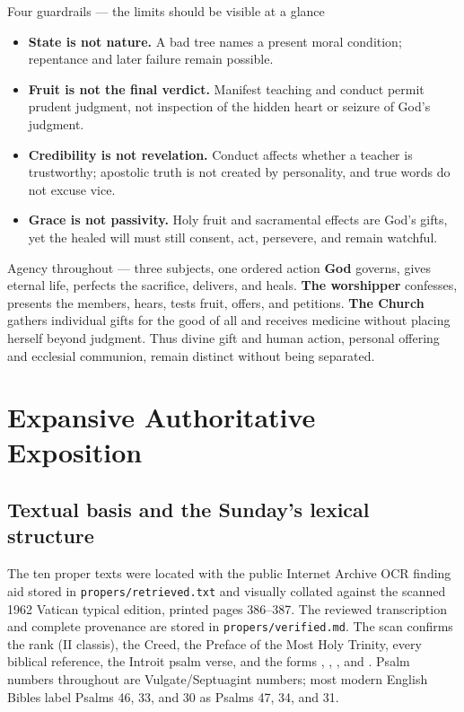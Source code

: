 \begin{deepstudy}
\begin{studybox}{Four guardrails --- the limits should be visible at a glance}
\begin{itemize}[topsep=0pt,itemsep=0.25em,parsep=0pt]
\item \textbf{State is not nature.} A bad tree names a present moral condition; repentance and later failure remain possible.
\item \textbf{Fruit is not the final verdict.} Manifest teaching and conduct permit prudent judgment, not inspection of the hidden heart or seizure of God's judgment.
\item \textbf{Credibility is not revelation.} Conduct affects whether a teacher is trustworthy; apostolic truth is not created by personality, and true words do not excuse vice.
\item \textbf{Grace is not passivity.} Holy fruit and sacramental effects are God's gifts, yet the healed will must still consent, act, persevere, and remain watchful.
\end{itemize}
\end{studybox}

\begin{massbox}{Agency throughout --- three subjects, one ordered action}
\textbf{God} governs, gives eternal life, perfects the sacrifice, delivers, and heals. \textbf{The worshipper} confesses, presents the members, hears, tests fruit, offers, and petitions. \textbf{The Church} gathers individual gifts for the good of all and receives medicine without placing herself beyond judgment. Thus divine gift and human action, personal offering and ecclesial communion, remain distinct without being separated.
\end{massbox}

\newpage
\section*{Expansive Authoritative Exposition}

\subsection*{Textual basis and the Sunday's lexical structure}

The ten proper texts were located with the public Internet Archive OCR finding aid stored in \texttt{propers/retrieved.txt} and visually collated against the scanned 1962 Vatican typical edition, printed pages 386--387. The reviewed transcription and complete provenance are stored in \texttt{propers/verified.md}. The scan confirms the rank (II classis), the Creed, the Preface of the Most Holy Trinity, every biblical reference, the Introit psalm verse, and the forms , , , and . Psalm numbers throughout are Vulgate/Septuagint numbers; most modern English Bibles label Psalms 46, 33, and 30 as Psalms 47, 34, and 31.


\end{deepstudy}
